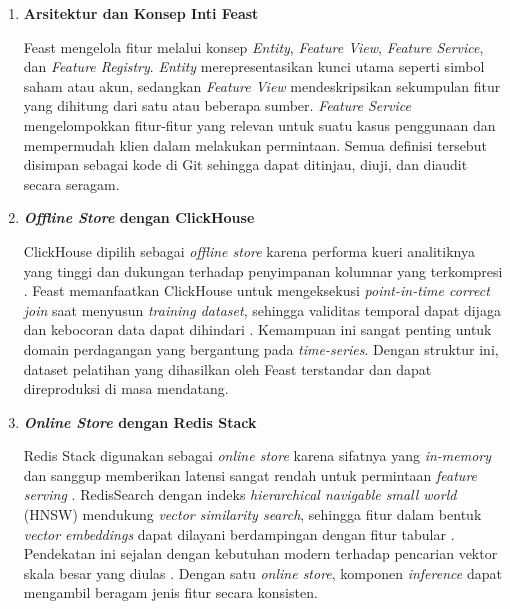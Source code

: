 \vspace{0.5em}
\begin{enumerate}
    \item \textbf{Arsitektur dan Konsep Inti Feast}  

    Feast mengelola fitur melalui konsep \textit{Entity}, \textit{Feature View}, \textit{Feature Service}, dan \textit{Feature Registry}. \textit{Entity} merepresentasikan kunci utama seperti simbol saham atau akun, sedangkan \textit{Feature View} mendeskripsikan sekumpulan fitur yang dihitung dari satu atau beberapa sumber. \textit{Feature Service} mengelompokkan fitur-fitur yang relevan untuk suatu kasus penggunaan dan mempermudah klien dalam melakukan permintaan. Semua definisi tersebut disimpan sebagai kode di Git sehingga dapat ditinjau, diuji, dan diaudit secara seragam.

    \vspace{0.5em}

    \item \textbf{\textit{Offline Store} dengan ClickHouse}  

    ClickHouse dipilih sebagai \textit{offline store} karena performa kueri analitiknya yang tinggi dan dukungan terhadap penyimpanan kolumnar yang terkompresi \autocite{clickhouse2024}. Feast memanfaatkan ClickHouse untuk mengeksekusi \textit{point-in-time correct join} saat menyusun \textit{training dataset}, sehingga validitas temporal dapat dijaga dan kebocoran data dapat dihindari \autocite{polyzotis2018data,wang2021leakage}. Kemampuan ini sangat penting untuk domain perdagangan yang bergantung pada \textit{time-series}. Dengan struktur ini, dataset pelatihan yang dihasilkan oleh Feast terstandar dan dapat direproduksi di masa mendatang.

    \vspace{0.5em}

    \item \textbf{\textit{Online Store} dengan Redis Stack}  

    Redis Stack digunakan sebagai \textit{online store} karena sifatnya yang \textit{in-memory} dan sanggup memberikan latensi sangat rendah untuk permintaan \textit{feature serving} \autocite{redis2024}. RedisSearch dengan indeks \textit{hierarchical navigable small world} (HNSW) mendukung \textit{vector similarity search}, sehingga fitur dalam bentuk \textit{vector embeddings} dapat dilayani berdampingan dengan fitur tabular \autocite{malkov2020efficient}. Pendekatan ini sejalan dengan kebutuhan modern terhadap pencarian vektor skala besar yang diulas \textcite{johnson2021billion}. Dengan satu \textit{online store}, komponen \textit{inference} dapat mengambil beragam jenis fitur secara konsisten.


\end{enumerate}
